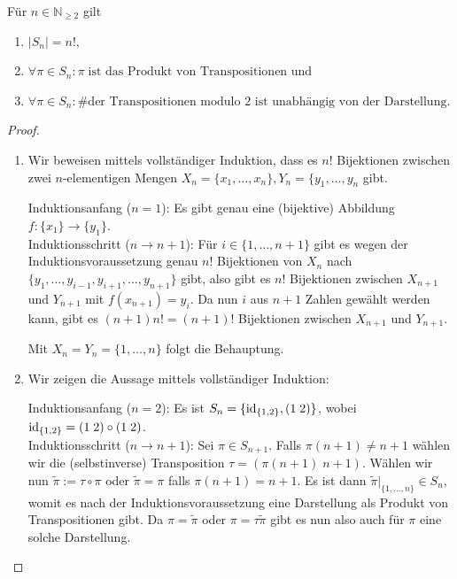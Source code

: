 \begin{proposition}\label{prop:sym_gruppe} Für $n \in \mathbb{N}_{\ge 2}$ gilt
    \begin{enumerate}
        \item $\vert S_n \vert = n!$,
        \item $\forall \pi \in S_n: \pi\;\text{ist das Produkt von Transpositionen}$ und
        \item $\forall \pi \in S_n: \text{\# der Transpositionen modulo 2 ist unabhängig von der Darstellung}$.
    \end{enumerate}
\end{proposition}
\begin{proof}{\ }
    \begin{enumerate}
        \item Wir beweisen mittels vollständiger Induktion, dass es $n!$ Bijektionen zwischen zwei $n$-elementigen Mengen $X_n = \{x_1, \ldots, x_n\}, Y_n = \{y_1, \ldots, y_n$ gibt.
        
        Induktionsanfang ($n = 1$): Es gibt genau eine (bijektive) Abbildung $f: \{x_1\} \to \{y_1\}$.\\
        Induktionsschritt ($n \to n+1$): Für $i \in \{1, \ldots, n+1\}$ gibt es wegen der Induktionsvoraussetzung genau $n!$ Bijektionen von $X_n$ nach $\{y_1, \ldots, y_{i-1}, y_{i+1}, \ldots, y_{n+1}\}$ gibt, also gibt es $n!$ Bijektionen zwischen $X_{n+1}$ und $Y_{n+1}$ mit $f(x_{n+1}) = y_i$. Da nun $i$ aus $n+1$ Zahlen gewählt werden kann, gibt es $(n+1)n! = (n+1)!$ Bijektionen zwischen $X_{n+1}$ und $Y_{n+1}$.

        Mit $X_n = Y_n = \{1, \ldots, n\}$ folgt die Behauptung.

        \item Wir zeigen die Aussage mittels vollständiger Induktion:
        
        Induktionsanfang ($n = 2$): Es ist $S_n = \{ \operatorname{id}_{\{1,2\}}, (1\; 2) \}$, wobei $\operatorname{id}_{\{1,2\}} = (1\; 2) \circ (1\; 2)$.\\
        Induktionsschritt ($n \to n+1$): Sei $\pi \in S_{n+1}$. Falls $\pi(n+1) \not= n+1$ wählen wir die (selbstinverse) Transposition $\tau = (\pi(n+1)\; n+1)$. Wählen wir nun $\tilde{\pi} := \tau \circ \pi$ oder $\tilde{\pi} = \pi$ falls $\pi(n+1) = n+1$. Es ist dann $\tilde{\pi}\vert_{\{1,\ldots,n\}} \in S_n$, womit es nach der Induktionsvoraussetzung eine Darstellung als Produkt von Transpositionen gibt. Da $\pi = \tilde\pi$ oder $\pi = \tau\tilde\pi$ gibt es nun also auch für $\pi$ eine solche Darstellung.


\end{enumerate}
\end{proof}
